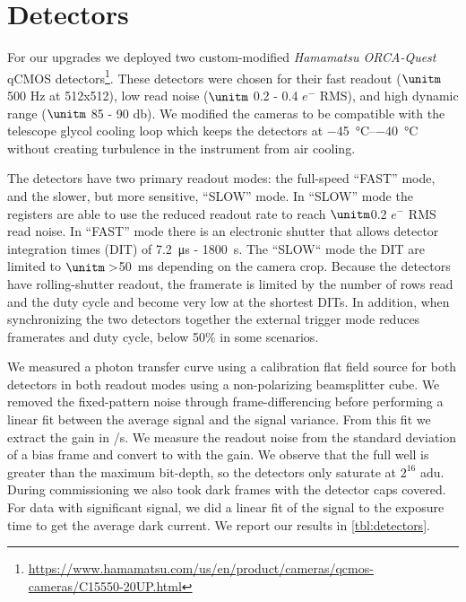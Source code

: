 \section{Detectors}\label{sec:detectors}

For our upgrades we deployed two custom-modified \textit{Hamamatsu ORCA-Quest} qCMOS detectors\footnote{\url{https://www.hamamatsu.com/us/en/product/cameras/qcmos-cameras/C15550-20UP.html}}. These detectors were chosen for their fast readout ($\unitm$500 Hz at 512x512), low read noise ($\unitm$ 0.2 - 0.4 $e^-$ RMS), and high dynamic range ($\unitm$ 85 - 90 \unit{\decibel}). We modified the cameras to be compatible with the telescope glycol cooling loop which keeps the detectors at \qtyrange{-45}{-40}{\celsius} without creating turbulence in the instrument from air cooling.

The detectors have two primary readout modes: the full-speed ``FAST'' mode, and the slower, but more sensitive, ``SLOW'' mode. In ``SLOW'' mode the registers are able to use the reduced readout rate to reach $\unitm$0.2 $e^-$ RMS read noise. In ``FAST'' mode there is an electronic shutter that allows detector integration times (DIT) of \qty{7.2}{\micro\second} - \qty{1800}{\second}. The ``SLOW`` mode the DIT are limited to $\unitm >$\qty{50}{\milli\second} depending on the camera crop. Because the detectors have rolling-shutter readout, the framerate is limited by the number of rows read and the duty cycle and become very low at the shortest DITs. In addition, when synchronizing the two detectors together the external trigger mode reduces framerates and duty cycle, below 50\% in some scenarios.

We measured a photon transfer curve using a calibration flat field source for both detectors in both readout modes using a non-polarizing beamsplitter cube. We removed the fixed-pattern noise through frame-differencing before performing a linear fit between the average signal and the signal variance. From this fit we extract the gain in \unit{\electron/\second}. We measure the readout noise from the standard deviation of a bias frame and convert to \unit{\electron} with the gain. We observe that the full well is greater than the maximum bit-depth, so the detectors only saturate at $2^{16}$ \unit{adu}. During commissioning we also took dark frames with the detector caps covered. For data with significant signal, we did a linear fit of the signal to the exposure time to get the average dark current. We report our results in \autoref{tbl:detectors}.


